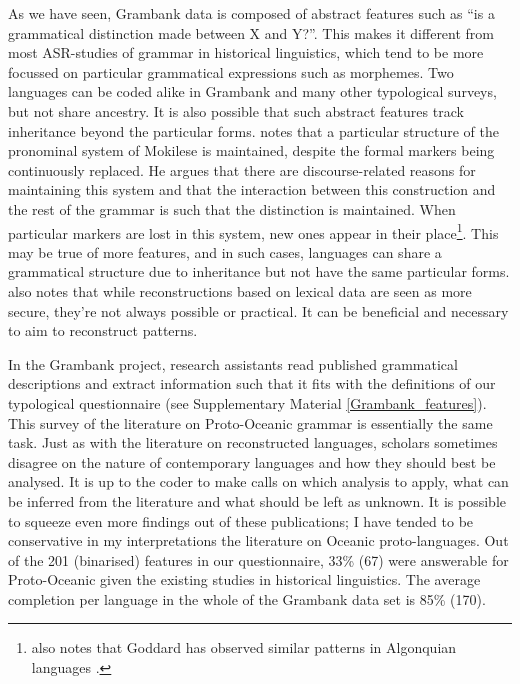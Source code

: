 \documentclass[12pt,letterpaper]{article}
\begin{document}
As we have seen, Grambank data is composed of abstract features such as ``is a grammatical distinction made between X and Y?''. This makes it different from most ASR-studies of grammar in historical linguistics, which tend to be more focussed on particular grammatical expressions such as morphemes. Two languages can be coded alike in Grambank and many other typological surveys, but not share ancestry. It is also possible that such abstract features track inheritance beyond the particular forms. \citet[503]{ross2004morphosyntactic} notes that a particular structure of the pronominal system of Mokilese is maintained, despite the formal markers being continuously replaced. He argues that there are discourse-related reasons for maintaining this system and that the interaction between this construction and the rest of the grammar is such that the distinction is maintained. When particular markers are lost in this system, new ones appear in their place\footnote{\citet{ross2004morphosyntactic} also notes that Goddard has observed similar patterns in Algonquian languages \citep{goddard1993algonquian}.}. This may be true of more features, and in such cases, languages can share a grammatical structure due to inheritance but not have the same particular forms. \citet[400-401]{evans2003study} also notes that while reconstructions based on lexical data are seen as more secure, they're not always possible or practical. It can be beneficial and necessary to aim to reconstruct patterns. %

In the Grambank project, research assistants read published grammatical descriptions and extract information such that it fits with the definitions of our typological questionnaire (see Supplementary Material \ref{Grambank_features}). This survey of the literature on Proto-Oceanic grammar is essentially the same task. Just as with the literature on reconstructed languages, scholars sometimes disagree on the nature of contemporary languages and how they should best be analysed. It is up to the coder to make calls on which analysis to apply, what can be inferred from the literature and what should be left as unknown. It is possible to squeeze even more findings out of these publications; I have tended to be conservative in my interpretations the literature on Oceanic proto-languages. Out of the 201 (binarised) features in our questionnaire, 33\% (67) were answerable for Proto-Oceanic given the existing studies in historical linguistics. The average completion per language in the whole of the Grambank data set is 85\% (170). 
\end{document}
